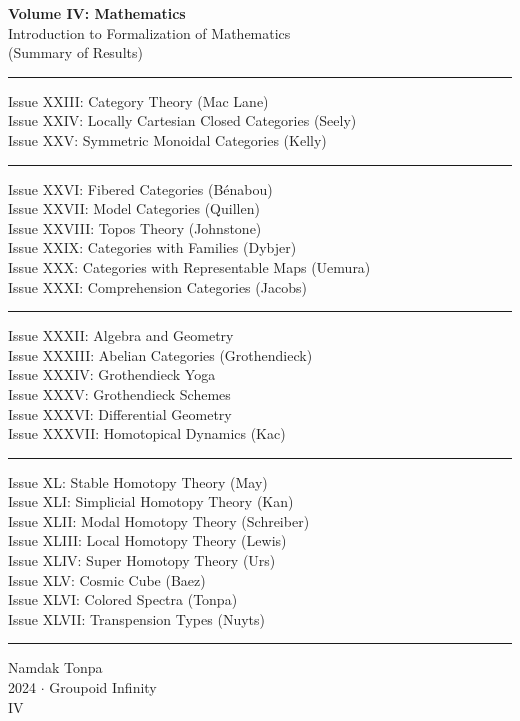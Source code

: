 \documentclass{article}
\begin{document}
\begin{titlepage}
    \centering
    \vspace*{0.5in}
    \Huge
    \textbf{Volume IV: Mathematics} \\
    \LARGE
    Introduction to Formalization of Mathematics \\
    (Summary of Results) \\
    \vspace{1.5in}
    \small
    \flushleft
    \vspace{-2mm} \rule{\textwidth}{0.4pt}
    Issue XXIII: Category Theory (Mac Lane) \\
    Issue XXIV: Locally Cartesian Closed Categories (Seely) \\
    Issue XXV: Symmetric Monoidal Categories (Kelly) \\
    \vspace{-2mm} \rule{\textwidth}{0.4pt}
    Issue XXVI: Fibered Categories (Bénabou) \\
    Issue XXVII: Model Categories (Quillen) \\
    Issue XXVIII: Topos Theory (Johnstone) \\
    Issue XXIX: Categories with Families (Dybjer) \\
    Issue XXX: Categories with Representable Maps (Uemura) \\
    Issue XXXI: Comprehension Categories (Jacobs) \\
    \vspace{-2mm} \rule{\textwidth}{0.4pt}
    Issue XXXII: Algebra and Geometry \\
    Issue XXXIII: Abelian Categories (Grothendieck) \\
    Issue XXXIV: Grothendieck Yoga \\
    Issue XXXV: Grothendieck Schemes \\
    Issue XXXVI: Differential Geometry \\
    Issue XXXVII: Homotopical Dynamics (Kac) \\
    \vspace{-2mm} \rule{\textwidth}{0.4pt}
    Issue XL: Stable Homotopy Theory (May) \\
    Issue XLI: Simplicial Homotopy Theory (Kan) \\
    Issue XLII: Modal Homotopy Theory (Schreiber) \\
    Issue XLIII: Local Homotopy Theory (Lewis) \\
    Issue XLIV: Super Homotopy Theory (Urs) \\
    Issue XLV: Cosmic Cube (Baez) \\
    Issue XLVI: Colored Spectra (Tonpa) \\
    Issue XLVII: Transpension Types (Nuyts) \\
    \vspace{-2mm} \rule{\textwidth}{0.4pt}
    \centering
    \vfill
    \large
    Namdak Tonpa \\
    \Large
    2024 $\cdot$ Groupoid Infinity \\
    IV
\end{titlepage}
\end{document}
